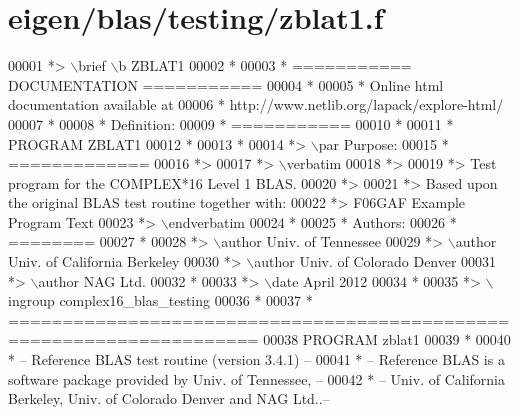 \hypertarget{eigen_2blas_2testing_2zblat1_8f_source}{}\section{eigen/blas/testing/zblat1.f}
\label{eigen_2blas_2testing_2zblat1_8f_source}

\begin{DoxyCode}
00001 \textcolor{comment}{*> \(\backslash\)brief \(\backslash\)b ZBLAT1}
00002 \textcolor{comment}{*}
00003 \textcolor{comment}{*  =========== DOCUMENTATION ===========}
00004 \textcolor{comment}{*}
00005 \textcolor{comment}{* Online html documentation available at }
00006 \textcolor{comment}{*            http://www.netlib.org/lapack/explore-html/ }
00007 \textcolor{comment}{*}
00008 \textcolor{comment}{*  Definition:}
00009 \textcolor{comment}{*  ===========}
00010 \textcolor{comment}{*}
00011 \textcolor{comment}{*       PROGRAM ZBLAT1}
00012 \textcolor{comment}{* }
00013 \textcolor{comment}{*}
00014 \textcolor{comment}{*> \(\backslash\)par Purpose:}
00015 \textcolor{comment}{*  =============}
00016 \textcolor{comment}{*>}
00017 \textcolor{comment}{*> \(\backslash\)verbatim}
00018 \textcolor{comment}{*>}
00019 \textcolor{comment}{*>    Test program for the COMPLEX*16 Level 1 BLAS.}
00020 \textcolor{comment}{*>}
00021 \textcolor{comment}{*>    Based upon the original BLAS test routine together with:}
00022 \textcolor{comment}{*>    F06GAF Example Program Text}
00023 \textcolor{comment}{*> \(\backslash\)endverbatim}
00024 \textcolor{comment}{*}
00025 \textcolor{comment}{*  Authors:}
00026 \textcolor{comment}{*  ========}
00027 \textcolor{comment}{*}
00028 \textcolor{comment}{*> \(\backslash\)author Univ. of Tennessee }
00029 \textcolor{comment}{*> \(\backslash\)author Univ. of California Berkeley }
00030 \textcolor{comment}{*> \(\backslash\)author Univ. of Colorado Denver }
00031 \textcolor{comment}{*> \(\backslash\)author NAG Ltd. }
00032 \textcolor{comment}{*}
00033 \textcolor{comment}{*> \(\backslash\)date April 2012}
00034 \textcolor{comment}{*}
00035 \textcolor{comment}{*> \(\backslash\)ingroup complex16\_blas\_testing}
00036 \textcolor{comment}{*}
00037 \textcolor{comment}{*  =====================================================================}
00038       \textcolor{keyword}{PROGRAM} zblat1
00039 \textcolor{comment}{*}
00040 \textcolor{comment}{*  -- Reference BLAS test routine (version 3.4.1) --}
00041 \textcolor{comment}{*  -- Reference BLAS is a software package provided by Univ. of Tennessee,    --}
00042 \textcolor{comment}{*  -- Univ. of California Berkeley, Univ. of Colorado Denver and NAG Ltd..--}

\end{DoxyCode}
